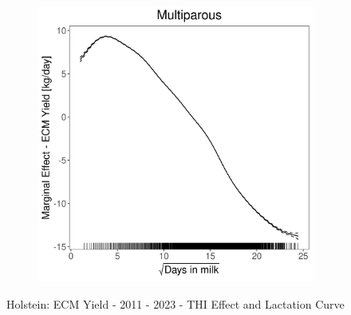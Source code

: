 \begin{figure}[H]
\begin{subfigure}[b]{0.45\textwidth}
    \end{subfigure}
    \hspace{0.05\textwidth} %
    \begin{subfigure}[b]{0.45\textwidth}
        \centering
        \includegraphics[width=\textwidth]{thesis/figures/models/ecm/after2010/ho_ecm_after2010/ho_ecm_after2010_marginal_dim_milk_multi.png}
    \end{subfigure}
    \caption[]{Holstein: ECM Yield - 2011 - 2023 - THI Effect and Lactation Curve}
    \label{fig:main}
\end{figure}
